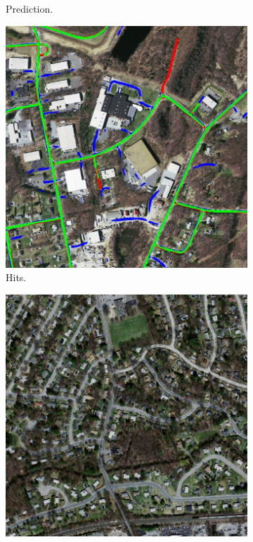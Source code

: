 \begin{figure}[H]
\begin{subfigure}{0.23\textwidth}
\caption{Prediction.}
\vspace{0.2cm} %
\end{subfigure}
\hspace*{\fill} %
\begin{subfigure}{0.23\textwidth}
\includegraphics[width=\textwidth]{figs/appendix/hit11728825_15.jpg}
\caption{Hits.}
\vspace{0.2cm} %
\end{subfigure}
\begin{subfigure}{0.23\textwidth}
\includegraphics[width=\textwidth]{figs/appendix/img20878930_15.jpg}

\end{subfigure}
\end{figure}
